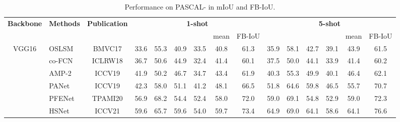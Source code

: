 \documentclass[journal]{IEEEtran}
\begin{document}
\begin{table*}[t]
\renewcommand\arraystretch{1.2}
\setlength{\tabcolsep}{1.7mm}
\caption{Performance on PASCAL-\cite{shaban2017one} in mIoU and FB-IoU. }
\label{table:result_pascal}
\begin{center}
\begin{tabular}{c|lc|cccccc|cccccc}
\hline
\multirow{2}{*}{\textbf{Backbone}} & \multirow{2}{*}{\textbf{Methods}} &
\multirow{2}{*}{\textbf{Publication}} &
\multicolumn{6}{|c|}{\textbf{1-shot}} & \multicolumn{6}{c}{\textbf{5-shot}} \\ 
\multicolumn{1}{l|}{}      & \multicolumn{1}{l}{} & &     &     &     &     & mean & FB-IoU &     &    &     &     & mean & FB-IoU \\ 
\hline
\multirow{9}{*}{VGG16}      & OSLSM \cite{shaban2017one} & BMVC17               & 33.6 & 55.3 & 40.9 & 33.5 & 40.8 & 61.3   & 35.9 & 58.1 & 42.7 & 39.1 & 43.9 & 61.5   \\
                          & co-FCN \cite{rakelly2018conditional} & ICLRW18             & 36.7 & 50.6 & 44.9 & 32.4 & 41.4 & 60.1   & 37.5 & 50.0 & 44.1 & 33.9 & 41.4 & 60.2   \\
                          & AMP-2 \cite{siam2019adaptive}  & ICCV19             & 41.9 & 50.2 & 46.7 & 34.7 & 43.4 & 61.9   & 40.3 & 55.3 & 49.9 & 40.1 & 46.4 & 62.1   \\
                          & PANet \cite{wang2019panet}  &   ICCV19           & 42.3 & 58.0 & 51.1 & 41.2 & 48.1 & 66.5   & 51.8 & 64.6 & 59.8 & 46.5 & 55.7 & 70.7   \\
                          & PFENet \cite{tian2020prior} &  TPAMI20             & 56.9 & 68.2 & 54.4 & 52.4 & 58.0 & 72.0   & 59.0 & 69.1 & 54.8 & 52.9 & 59.0 & 72.3   \\
                          & HSNet \cite{min2021hypercorrelation} & ICCV21              & 59.6 & 65.7 & 59.6 & 54.0 & 59.7 & 73.4   & 64.9 & 69.0 & 64.1 & 58.6 & 64.1 & 76.6   \\
 

\end{tabular}
\end{center}
\end{table*}
\end{document}
